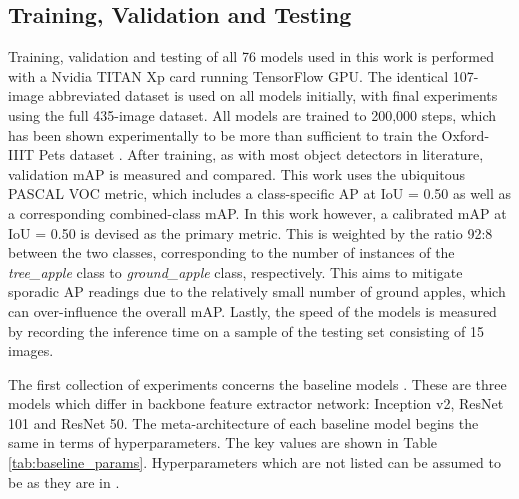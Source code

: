 \documentclass[journal]{IEEEtran}
\begin{document}
\subsection{Training, Validation and Testing}




Training, validation and testing of all 76 models used in this work is performed with a Nvidia TITAN Xp card running TensorFlow GPU. The identical 107-image abbreviated dataset is used on all models initially, with final experiments using the full 435-image dataset. All models are trained to 200,000 steps, which has been shown experimentally to be more than sufficient to train the Oxford-IIIT Pets dataset \cite{modelzoo}.
After training, as with most object detectors in literature, validation mAP is measured and compared. This work uses the ubiquitous PASCAL VOC metric, which includes a class-specific AP at IoU = 0.50 as well as a corresponding combined-class mAP. In this work however, a calibrated mAP at IoU = 0.50 is devised as the primary metric. This is weighted by the ratio 92:8 between the two classes, corresponding to the number of instances of the \textit{tree\_apple} class to \textit{ground\_apple} class, respectively. This aims to mitigate sporadic AP readings due to the relatively small number of ground apples, which can over-influence the overall mAP. Lastly, the speed of the models is measured by recording the inference time on a sample of the testing set consisting of 15 images.

The first collection of experiments concerns the baseline models \cite{modelzoo}. These are three models which differ in backbone feature extractor network: Inception v2, ResNet 101 and ResNet 50. The meta-architecture of each baseline model begins the same in terms of hyperparameters. The key values are shown in Table \ref{tab:baseline_params}. Hyperparameters which are not listed can be assumed to be as they are in \cite{fasterrcnn}.
\end{document}

